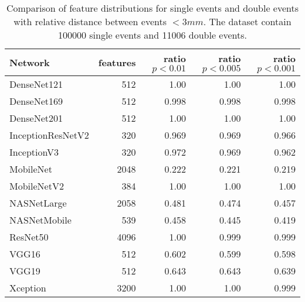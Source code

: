 \begin{table}
    \begin{tabular}{lrrrr}
	\hline
	 Network           &   features &   ratio $p < 0.01$ &   ratio $p < 0.005$ &   ratio $p < 0.001$ \\
	\hline
	 DenseNet121       &            512 &         1.00  &          1.00  &          1.00  \\
	 DenseNet169       &            512 &         0.998 &          0.998 &          0.998 \\
	 DenseNet201       &            512 &         1.00  &          1.00  &          1.00  \\
	 InceptionResNetV2 &            320 &         0.969 &          0.969 &          0.966 \\
	 InceptionV3       &            320 &         0.972 &          0.969 &          0.962 \\
	 MobileNet         &           2048 &         0.222 &          0.221 &          0.219 \\
	 MobileNetV2       &            384 &         1.00  &          1.00  &          1.00  \\
	 NASNetLarge       &           2058 &         0.481 &          0.474 &          0.457 \\
	 NASNetMobile      &            539 &         0.458 &          0.445 &          0.419 \\
	 ResNet50          &           4096 &         1.00  &          0.999 &          0.999 \\
	 VGG16             &            512 &         0.602 &          0.599 &          0.598 \\
	 VGG19             &            512 &         0.643 &          0.643 &          0.639 \\
	 Xception          &           3200 &         1.00  &          1.00  &          0.999 \\
	\hline
    \end{tabular}
    \caption{Comparison of feature distributions for single events and double events with relative distance
	between events $< 3mm$. The dataset contain 100000 single events and 11006 double events.}
    \label{tab:features-close}
\end{table}
